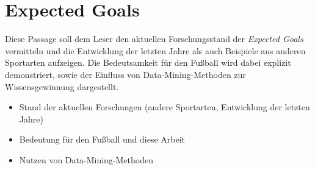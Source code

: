 \section{Expected Goals}
Diese Passage soll dem Leser den aktuellen Forschungsstand der \textit{Expected Goals} vermitteln und die Entwicklung der letzten Jahre als auch Beispiele aus anderen Sportarten aufzeigen. Die Bedeutsamkeit für den Fußball wird dabei explizit demonstriert, sowie der Einfluss von Data-Mining-Methoden zur Wissensgewinnung dargestellt.


\begin{itemize}
\item Stand der aktuellen Forschungen (andere Sportarten, Entwicklung der letzten Jahre)
\item Bedeutung für den Fußball und diese Arbeit
\item Nutzen von Data-Mining-Methoden
\end{itemize}
